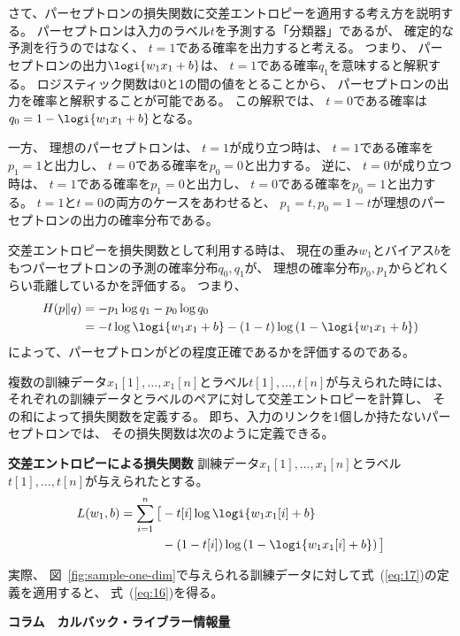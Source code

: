 さて、パーセプトロンの損失関数に交差エントロピーを適用する考え方を説明する。
パーセプトロンは入力のラベル$t$を予測する「分類器」であるが、
確定的な予測を行うのではなく、
$t = 1$である確率を出力すると考える。
つまり、
パーセプトロンの出力$\logi{w_1 x_1 + b}$は、
$t = 1$である確率$q_1$を意味すると解釈する。
ロジスティック関数は0と1の間の値をとることから、
パーセプトロンの出力を確率と解釈することが可能である。
この解釈では、
$t = 0$である確率は$q_0 = 1 - \logi{w_1 x_1 + b}$となる。

一方、
理想のパーセプトロンは、
$t = 1$が成り立つ時は、
$t = 1$である確率を$p_1 = 1$と出力し、
$t = 0$である確率を$p_0 = 0$と出力する。
逆に、
$t = 0$が成り立つ時は、
$t = 1$である確率を$p_1 = 0$と出力し、
$t = 0$である確率を$p_0 = 1$と出力する。
$t = 1$と$t = 0$の両方のケースをあわせると、
$p_1 = t, p_0 = 1 - t$が理想のパーセプトロンの出力の確率分布である。

交差エントロピーを損失関数として利用する時は、
現在の重み$w_1$とバイアス$b$をもつパーセプトロンの予測の確率分布$q_0, q_1$が、
理想の確率分布$p_0, p_1$からどれくらい乖離しているかを評価する。
つまり、
\begin{align*}
  H(p \Vert q)
  &
    = - p_1 \log q_1 - p_0 \log q_0
  \\&
  = - t \log \logi{w_1 x_1 + b} - (1 - t) \log \left(1 - \logi{w_1 x_1 + b}\right)
\end{align*}
によって、パーセプトロンがどの程度正確であるかを評価するのである。

複数の訓練データ$x_1[1], \dots, x_1[n]$とラベル$t[1], \dots, t[n]$が与えられた時には、
それぞれの訓練データとラベルのペアに対して交差エントロピーを計算し、
その和によって損失関数を定義する。
即ち、入力のリンクを1個しか持たないパーセプトロンでは、
その損失関数は次のように定義できる。

\begin{itembox}{\bf 交差エントロピーによる損失関数}
  訓練データ$x_1[1], \dots, x_1[n]$とラベル$t[1], \dots, t[n]$が与えられたとする。
  \begin{align}
    L(w_1, b) = \sum_{i=1}^n
    \big [
    &\nonumber
      - t[i] \log \logi{w_1 x_1[i] + b}
    \\&\label{eq:17}
      - (1 - t[i]) \log \left(1 - \logi{w_1 x_1[i] + b}\right)\big]
  \end{align}
\end{itembox}
実際、
図~\ref{fig:sample-one-dim}で与えられる訓練データに対して式~(\ref{eq:17})の定義を適用すると、
式~(\ref{eq:16})を得る。

\begin{itembox}{\bf コラム　カルバック・ライブラー情報量}
  
\end{itembox}

